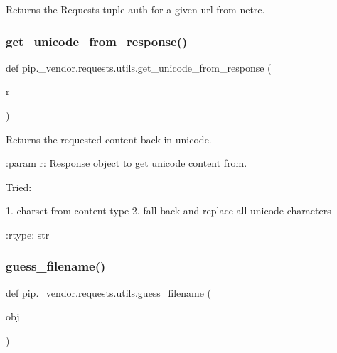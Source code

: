\begin{DoxyVerb}Returns the Requests tuple auth for a given url from netrc.\end{DoxyVerb}
 \mbox{\label{namespacepip_1_1__vendor_1_1requests_1_1utils_ae0ae60e469f026dce18fcbb979c9d806}} 
\subsubsection{\texorpdfstring{get\+\_\+unicode\+\_\+from\+\_\+response()}{get\_unicode\_from\_response()}}
{\footnotesize\ttfamily def pip.\+\_\+vendor.\+requests.\+utils.\+get\+\_\+unicode\+\_\+from\+\_\+response (\begin{DoxyParamCaption}\item[{}]{r }\end{DoxyParamCaption})}

\begin{DoxyVerb}Returns the requested content back in unicode.

:param r: Response object to get unicode content from.

Tried:

1. charset from content-type
2. fall back and replace all unicode characters

:rtype: str
\end{DoxyVerb}
 \mbox{\label{namespacepip_1_1__vendor_1_1requests_1_1utils_a8e4518d98e2701a9f26eedca1aaff79e}} 
\subsubsection{\texorpdfstring{guess\+\_\+filename()}{guess\_filename()}}
{\footnotesize\ttfamily def pip.\+\_\+vendor.\+requests.\+utils.\+guess\+\_\+filename (\begin{DoxyParamCaption}\item[{}]{obj }\end{DoxyParamCaption})}

